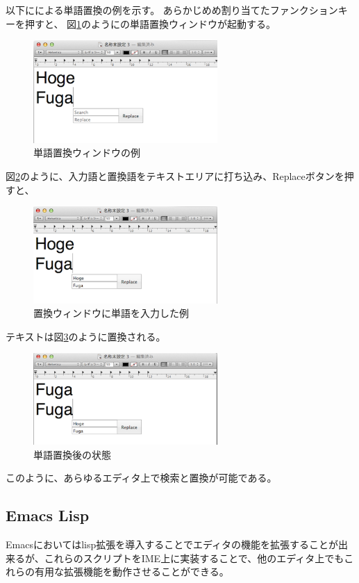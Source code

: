 以下に{\system}による単語置換の例を示す。
あらかじめめ割り当てたファンクションキーを押すと、
図\ref{search1}のように{\system}の単語置換ウィンドウが起動する。

\begin{figure}[H]
\centerline{\includegraphics[width=70mm,bb=0 0 360 215]{figures/replace1.png}}
\caption{単語置換ウィンドウの例}
\label{search1}
\end{figure}

図\ref{search2}のように、入力語と置換語をテキストエリアに打ち込み、Replaceボタンを押すと、

\begin{figure}[H]
\centerline{\includegraphics[width=70mm,bb=0 0 360 191]{figures/replace2.png}}
\caption{置換ウィンドウに単語を入力した例}
\label{search2}
\end{figure}


テキストは図\ref{search3}のように置換される。

\begin{figure}[H]
\centerline{\includegraphics[width=70mm,bb=0 0 360 191]{figures/replace3.png}}
\caption{単語置換後の状態}
\label{search3}
\end{figure}

このように、あらゆるエディタ上で検索と置換が可能である。

\subsection{Emacs Lisp}
Emacsにおいてはlisp拡張を導入することでエディタの機能を拡張することが出来るが、これらのスクリプトをIME上に実装することで、他のエディタ上でもこれらの有用な拡張機能を動作させることができる。

